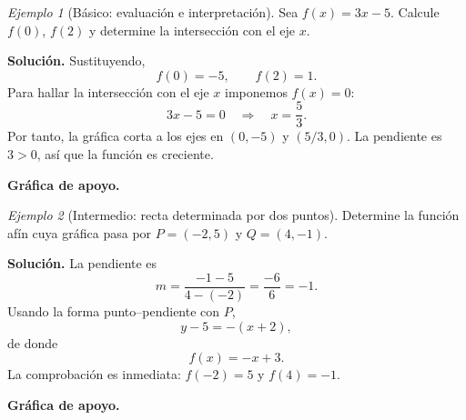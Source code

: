 \documentclass[12pt]{article}
\theoremstyle{remark}
\newtheorem{ejemplo}{Ejemplo}[section]
\begin{document}
\begin{ejemplo}[Básico: evaluación e interpretación]
Sea $f(x)=3x-5$. Calcule $f(0)$, $f(2)$ y determine la intersección con el eje $x$.

\textbf{Solución.} Sustituyendo,
\[
f(0)=-5,\qquad f(2)=1.
\]
Para hallar la intersección con el eje $x$ imponemos $f(x)=0$:
\[
3x-5=0\quad\Longrightarrow\quad x=\frac53.
\]
Por tanto, la gráfica corta a los ejes en $(0,-5)$ y $(5/3,0)$. La pendiente es $3>0$, así que la función es creciente.


\textbf{Gráfica de apoyo.}\medskip
\begin{center}
\end{center}

\end{ejemplo}

\begin{ejemplo}[Intermedio: recta determinada por dos puntos]
Determine la función afín cuya gráfica pasa por $P=(-2,5)$ y $Q=(4,-1)$.

\textbf{Solución.} La pendiente es
\[
m=\frac{-1-5}{4-(-2)}=\frac{-6}{6}=-1.
\]
Usando la forma punto--pendiente con $P$,
\[
y-5=-(x+2),
\]
de donde
\[
\boxed{f(x)=-x+3}.
\]
La comprobación es inmediata: $f(-2)=5$ y $f(4)=-1$.


\textbf{Gráfica de apoyo.}\medskip
\begin{center}
\end{center}

\end{ejemplo}
\end{document}

